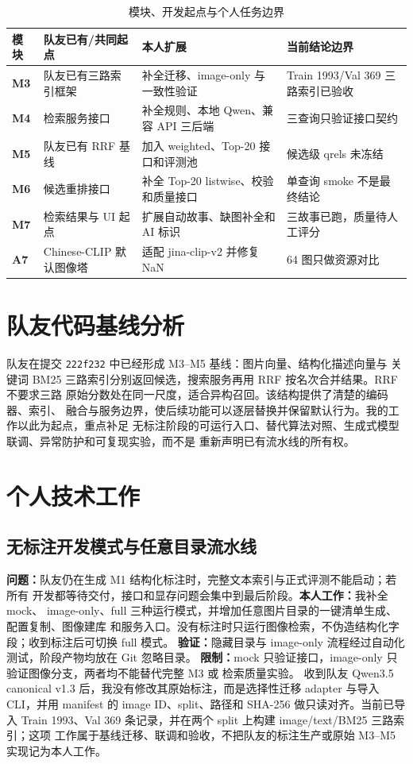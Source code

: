 \documentclass[UTF8,11pt,a4paper]{ctexart}
\begin{document}
\begin{table}[htbp]
\centering
\small
\caption{模块、开发起点与个人任务边界}
\begin{tabularx}{\textwidth}{>{\bfseries}p{1.0cm}YYY}
\toprule
模块 & 队友已有/共同起点 & 本人扩展 & 当前结论边界 \\
\midrule
M3 & 队友已有三路索引框架 & 补全迁移、image-only 与一致性验证 & Train 1993/Val 369 三路索引已验收 \\
M4 & 检索服务接口 & 补全规则、本地 Qwen、兼容 API 三后端 & 三查询只验证接口契约 \\
M5 & 队友已有 RRF 基线 & 加入 weighted、Top-20 接口和评测池 & 候选级 qrels 未冻结 \\
M6 & 候选重排接口 & 补全 Top-20 listwise、校验和质量接口 & 单查询 smoke 不是最终结论 \\
M7 & 检索结果与 UI 起点 & 扩展自动故事、缺图补全和 AI 标识 & 三故事已跑，质量待人工评分 \\
A7 & Chinese-CLIP 默认图像塔 & 适配 jina-clip-v2 并修复 NaN & 64 图只做资源对比 \\
\bottomrule
\end{tabularx}
\end{table}

\section{队友代码基线分析}

队友在提交 \texttt{222f232} 中已经形成 M3--M5 基线：图片向量、结构化描述向量与
关键词 BM25 三路索引分别返回候选，搜索服务再用 RRF 按名次合并结果。RRF 不要求三路
原始分数处在同一尺度，适合异构召回\citep{rrf2009}。该结构提供了清楚的编码器、索引、
融合与服务边界，使后续功能可以逐层替换并保留默认行为。我的工作以此为起点，重点补足
无标注阶段的可运行入口、替代算法对照、生成式模型联调、异常防护和可复现实验，而不是
重新声明已有流水线的所有权。

\section{个人技术工作}

\subsection{无标注开发模式与任意目录流水线}

\textbf{问题：}队友仍在生成 M1 结构化标注时，完整文本索引与正式评测不能启动；若所有
开发都等待交付，接口和显存问题会集中到最后阶段。\textbf{本人工作：}我补全 mock、
image-only、full 三种运行模式，并增加任意图片目录的一键清单生成、配置复制、图像建库
和服务入口。没有标注时只运行图像检索，不伪造结构化字段；收到标注后可切换 full 模式。
\textbf{验证：}隐藏目录与 image-only 流程经过自动化测试，阶段产物均放在 Git 忽略目录。
\textbf{限制：}mock 只验证接口，image-only 只验证图像分支，两者均不能替代完整 M3 或
检索质量实验。
收到队友 Qwen3.5 canonical v1.3 后，我没有修改其原始标注，而是选择性迁移 adapter
与导入 CLI，并用 manifest 的 image ID、split、路径和 SHA-256 做只读对齐。当前已导入
Train 1993、Val 369 条记录，并在两个 split 上构建 image/text/BM25 三路索引；这项
工作属于基线迁移、联调和验收，不把队友的标注生产或原始 M3--M5 实现记为本人工作。
\end{document}
